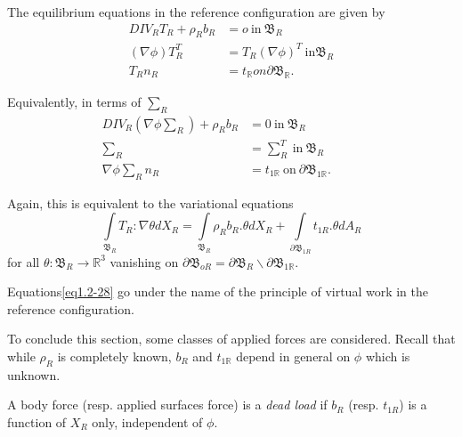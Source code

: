 \begin{theorem}\label{chap1-thm1.2.3}%
The equilibrium equations in the reference configuration are given by  
\begin{align*}
 DIV_R T_R + \rho_R b_R & = o  ~\text{in}~
 \mathfrak{B}_R\tag{1.2-22}\label{eq1.2-22}\\ 
  (\nabla  \phi ) T^T_R &= T_R (\nabla  \phi)^{T}  ~\text{in}
  \mathfrak{B}_R\tag{1.2-23}\label{eq1.2-23}\\ 
  T_R n_R & = t_{\mathbb{R}}  on  \partial
  \mathfrak{B}_{\mathbb{R}}.\tag{1.2-24}\label{eq1.2-24} 
\end{align*}

Equivalently, in terms of $\sum_R$
\begin{align*}
  DIV_R (\nabla  \phi\sum_R) + \rho_R b_R & = 0  ~\text{in}~
  \mathfrak{B}_R\tag{1.2-25}\label{eq1.2-25}\\
  \sum_R & = \sum_R^T ~\text{in}~ \mathfrak{B}_R\tag{1.2-26}\label{eq1.2-26}\\
  \nabla  \phi \sum_R n_R & = t_{1\mathbb{R}}  ~\text{on}~  \partial
  \mathfrak{B}_{1\mathbb{R}}.\hspace{1cm}\tag{1.2-27}\label{eq1.2-27} 
\end{align*}

Again, this is equivalent to the variational equations 
\begin{equation*}
  \int\limits_{\mathfrak{B}_R} T_R : \nabla  \theta  dX_R =
  \int\limits_{\mathfrak{B}_R} \rho_R b_R.\theta dX_R +
  \int\limits_{\partial \mathfrak{B}_{1R}} t_{1R}.\theta dA_R
  \tag{1.2-28} \label{eq1.2-28}
\end{equation*}
for all $\theta : \mathfrak{B}_R \rightarrow \mathbb{R}^3$ vanishing
on $\partial \mathfrak{B}_{oR} = \partial \mathfrak{B}_R \backslash
\partial \mathfrak{B}_{1\mathbb{R}}$. 
\end{theorem}

\begin{remark}\label{chap1-rem1.2.5}%
Equations\pageoriginale \eqref{eq1.2-28} go under the name of the
principle of virtual work in the reference configuration. 
\end{remark}

To conclude this section, some classes of applied forces are
considered. Recall that while $\rho_R$ is completely known, $b_R$ and
$t_{1\mathbb{R}}$ depend in general on $\phi$ which is unknown. 

A body force (resp. applied surfaces force) is a
\textit{dead load} if 
$b_R$ (resp. $t_{1R}$) is a function of $X_R$ only, independent of
$\phi$. 

